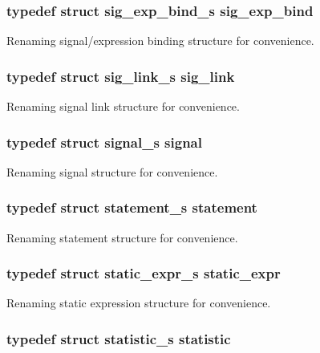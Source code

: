 \subsubsection{\setlength{\rightskip}{0pt plus 5cm}typedef struct {\bf sig\_\-exp\_\-bind\_\-s} {\bf sig\_\-exp\_\-bind}}\label{defines_8h_a175}


Renaming signal/expression binding structure for convenience. 
\subsubsection{\setlength{\rightskip}{0pt plus 5cm}typedef struct {\bf sig\_\-link\_\-s} {\bf sig\_\-link}}\label{defines_8h_a161}


Renaming signal link structure for convenience. 
\subsubsection{\setlength{\rightskip}{0pt plus 5cm}typedef struct {\bf signal\_\-s} {\bf signal}}\label{defines_8h_a160}


Renaming signal structure for convenience. 
\subsubsection{\setlength{\rightskip}{0pt plus 5cm}typedef struct {\bf statement\_\-s} {\bf statement}}\label{defines_8h_a162}


Renaming statement structure for convenience. 
\subsubsection{\setlength{\rightskip}{0pt plus 5cm}typedef struct {\bf static\_\-expr\_\-s} {\bf static\_\-expr}}\label{defines_8h_a173}


Renaming static expression structure for convenience. 
\subsubsection{\setlength{\rightskip}{0pt plus 5cm}typedef struct {\bf statistic\_\-s} {\bf statistic}}\label{defines_8h_a167}


